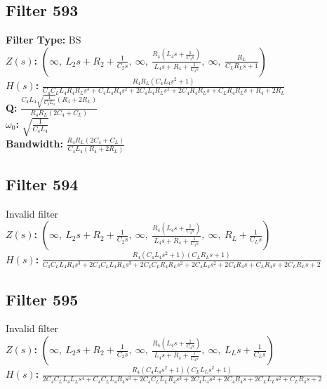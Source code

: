 \documentclass{article}
\begin{document}
\subsection*{Filter 593}
\textbf{Filter Type:} BS \\ 
\textbf{$Z(s)$:} $\left( \infty, \  L_{2} s + R_{2} + \frac{1}{C_{2} s}, \  \infty, \  \frac{R_{4} \left(L_{4} s + \frac{1}{C_{4} s}\right)}{L_{4} s + R_{4} + \frac{1}{C_{4} s}}, \  \infty, \  \frac{R_{L}}{C_{L} R_{L} s + 1}\right)$ \\ 
\textbf{$H(s)$:} $\frac{R_{4} R_{L} \left(C_{4} L_{4} s^{2} + 1\right)}{C_{4} C_{L} L_{4} R_{4} R_{L} s^{3} + C_{4} L_{4} R_{4} s^{2} + 2 C_{4} L_{4} R_{L} s^{2} + 2 C_{4} R_{4} R_{L} s + C_{L} R_{4} R_{L} s + R_{4} + 2 R_{L}}$ \\ 
\textbf{Q:} $\frac{C_{4} L_{4} \sqrt{\frac{1}{C_{4} L_{4}}} \left(R_{4} + 2 R_{L}\right)}{R_{4} R_{L} \left(2 C_{4} + C_{L}\right)}$ \\ 
\textbf{$\omega_0$:} $\sqrt{\frac{1}{C_{4} L_{4}}}$ \\ 
\textbf{Bandwidth:} $\frac{R_{4} R_{L} \left(2 C_{4} + C_{L}\right)}{C_{4} L_{4} \left(R_{4} + 2 R_{L}\right)}$ \\ 
\subsection*{Filter 594}
Invalid filter \\ 
\textbf{$Z(s)$:} $\left( \infty, \  L_{2} s + R_{2} + \frac{1}{C_{2} s}, \  \infty, \  \frac{R_{4} \left(L_{4} s + \frac{1}{C_{4} s}\right)}{L_{4} s + R_{4} + \frac{1}{C_{4} s}}, \  \infty, \  R_{L} + \frac{1}{C_{L} s}\right)$ \\ 
\textbf{$H(s)$:} $\frac{R_{4} \left(C_{4} L_{4} s^{2} + 1\right) \left(C_{L} R_{L} s + 1\right)}{C_{4} C_{L} L_{4} R_{4} s^{3} + 2 C_{4} C_{L} L_{4} R_{L} s^{3} + 2 C_{4} C_{L} R_{4} R_{L} s^{2} + 2 C_{4} L_{4} s^{2} + 2 C_{4} R_{4} s + C_{L} R_{4} s + 2 C_{L} R_{L} s + 2}$ \\ 
\subsection*{Filter 595}
Invalid filter \\ 
\textbf{$Z(s)$:} $\left( \infty, \  L_{2} s + R_{2} + \frac{1}{C_{2} s}, \  \infty, \  \frac{R_{4} \left(L_{4} s + \frac{1}{C_{4} s}\right)}{L_{4} s + R_{4} + \frac{1}{C_{4} s}}, \  \infty, \  L_{L} s + \frac{1}{C_{L} s}\right)$ \\ 
\textbf{$H(s)$:} $\frac{R_{4} \left(C_{4} L_{4} s^{2} + 1\right) \left(C_{L} L_{L} s^{2} + 1\right)}{2 C_{4} C_{L} L_{4} L_{L} s^{4} + C_{4} C_{L} L_{4} R_{4} s^{3} + 2 C_{4} C_{L} L_{L} R_{4} s^{3} + 2 C_{4} L_{4} s^{2} + 2 C_{4} R_{4} s + 2 C_{L} L_{L} s^{2} + C_{L} R_{4} s + 2}$ \\ 
\end{document}
